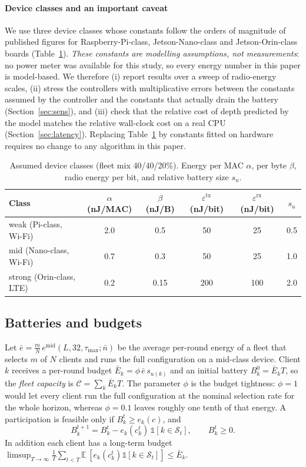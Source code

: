 \paragraph{Device classes and an important caveat}
We use three device classes whose constants follow the orders of magnitude of published figures for Raspberry-Pi-class, Jetson-Nano-class and Jetson-Orin-class boards (Table~\ref{tab:devices}). \emph{These constants are modelling assumptions, not measurements}: no power meter was available for this study, so every energy number in this paper is model-based. We therefore (i) report results over a sweep of radio-energy scales, (ii) stress the controllers with multiplicative errors between the constants assumed by the controller and the constants that actually drain the battery (Section~\ref{sec:sens}), and (iii) check that the relative cost of depth predicted by the model matches the relative wall-clock cost on a real CPU (Section~\ref{sec:latency}). Replacing Table~\ref{tab:devices} by constants fitted on hardware requires no change to any algorithm in this paper.

\begin{table}[t]
\centering\small
\caption{Assumed device classes (fleet mix 40/40/20\%). Energy per MAC $\alpha$, per byte $\beta$, radio energy per bit, and relative battery size $s_u$.}\label{tab:devices}
\begin{tabular}{@{}lccccc@{}}
\toprule
Class & $\alpha$ (nJ/MAC) & $\beta$ (nJ/B) & $\varepsilon^{\mathrm{tx}}$ (nJ/bit) & $\varepsilon^{\mathrm{rx}}$ (nJ/bit) & $s_u$\\
\midrule
weak (Pi-class, Wi-Fi) & 2.0 & 0.5 & 50 & 25 & 0.5\\
mid (Nano-class, Wi-Fi) & 0.7 & 0.3 & 50 & 25 & 1.0\\
strong (Orin-class, LTE) & 0.2 & 0.15 & 200 & 100 & 2.0\\
\bottomrule
\end{tabular}
\end{table}

\subsection{Batteries and budgets}
Let $\bar e=\frac{m}{N}\,e^{\mathrm{mid}}(L,32,\tau_{\max};\bar n)$ be the average per-round energy of a fleet that selects $m$ of $N$ clients and runs the full configuration on a mid-class device. Client $k$ receives a per-round budget $\bar E_k=\phi\,\bar e\,s_{u(k)}$ and an initial battery $B_k^0=\bar E_k T$, so the \emph{fleet capacity} is $\mathcal C=\sum_k\bar E_kT$. The parameter $\phi$ is the budget tightness: $\phi=1$ would let every client run the full configuration at the nominal selection rate for the whole horizon, whereas $\phi=0.1$ leaves roughly one tenth of that energy. A participation is feasible only if $B_k^t\ge e_k(c)$, and
\begin{equation}\label{eq:battery}
B_k^{t+1}=B_k^t-e_k(c_k^t)\,\mathbb 1[k\in\mathcal S_t],\qquad B_k^t\ge 0 .
\end{equation}
In addition each client has a long-term budget
$\limsup_{T\to\infty}\frac1T\sum_{t<T}\mathbb E\,[e_k(c_k^t)\mathbb 1[k\in\mathcal S_t]]\le\bar E_k$.

